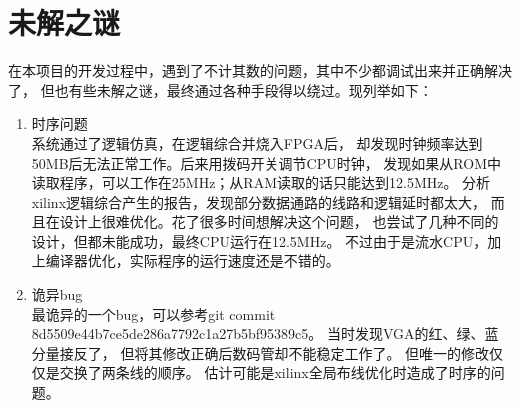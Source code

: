 
\section{未解之谜}
在本项目的开发过程中，遇到了不计其数的问题，其中不少都调试出来并正确解决了，
但也有些未解之谜，最终通过各种手段得以绕过。现列举如下：

\begin{enumerate}
	\item 时序问题 \\
		系统通过了逻辑仿真，在逻辑综合并烧入FPGA后，
		却发现时钟频率达到50MB后无法正常工作。后来用拨码开关调节CPU时钟，
		发现如果从ROM中读取程序，可以工作在25MHz；从RAM读取的话只能达到12.5MHz。
		分析xilinx逻辑综合产生的报告，发现部分数据通路的线路和逻辑延时都太大，
		而且在设计上很难优化。花了很多时间想解决这个问题，
		也尝试了几种不同的设计，但都未能成功，最终CPU运行在12.5MHz。
		不过由于是流水CPU，加上编译器优化，实际程序的运行速度还是不错的。
	\item 诡异bug \\
		最诡异的一个bug，可以参考git commit
		8d5509e44b7ce5de286a7792c1a27b5bf95389c5。
		当时发现VGA的红、绿、蓝分量接反了，
		但将其修改正确后数码管却不能稳定工作了。
		但唯一的修改仅仅是交换了两条线的顺序。
		估计可能是xilinx全局布线优化时造成了时序的问题。
\end{enumerate}


